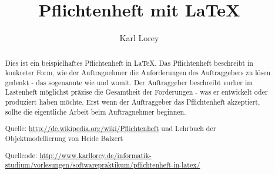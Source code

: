 \documentclass[a4paper, 12pt]{scrreprt}
\begin{document}
 
\title{Pflichtenheft mit LaTeX}
\author{Karl Lorey}
\maketitle
 
\begin{abstract}
Dies ist ein beispielhaftes Pflichtenheft in \LaTeX. Das Pflichtenheft
beschreibt in konkreter Form, wie der Auftragnehmer die Anforderungen des
Auftraggebers zu lösen gedenkt - das sogenannte wie und womit. Der Auftraggeber
beschreibt vorher im Lastenheft möglichst präzise die Gesamtheit der
Forderungen - was er entwickelt oder produziert haben möchte. Erst wenn der
Auftraggeber das Pflichtenheft akzeptiert, sollte die eigentliche Arbeit beim
Auftragnehmer beginnen.
\vspace{1cm}
 
Quelle: \url{http://de.wikipedia.org/wiki/Pflichtenheft} und Lehrbuch der
Objektmodellierung von Heide Balzert
\vspace{0.5cm}
 
Quellcode: \url{http://www.karllorey.de/informatik-studium/vorlesungen/softwarepraktikum/pflichtenheft-in-latex/}
\end{abstract}
 
\tableofcontents





 
 
 



 
\listoffigures
 
\end{document}
